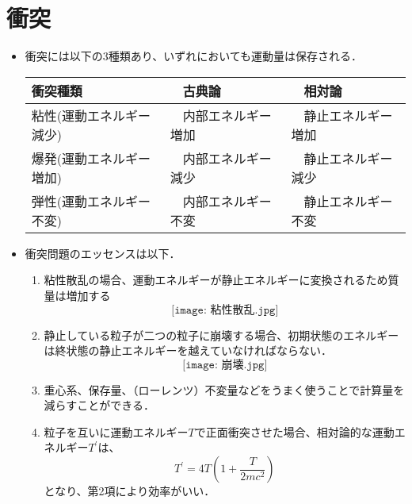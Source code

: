\documentclass[11pt,a4j]{jarticle}
\begin{document}
\section{衝突}
\begin{itemize}
	\item 衝突には以下の3種類あり、いずれにおいても運動量は保存される．
	\begin{table}[htb]
		\centering
		\begin{tabular}{|l|l|l|} \hline
			衝突種類　&　古典論	&　相対論	\\ \hline
			粘性(運動エネルギー減少)　&　内部エネルギー増加　&　静止エネルギー増加　\\ \hline
			爆発(運動エネルギー増加)　&　内部エネルギー減少　&　静止エネルギー減少　\\ \hline
			弾性(運動エネルギー不変)　&　内部エネルギー不変　&　静止エネルギー不変	\\ \hline
		\end{tabular}
	\end{table}
	\item 衝突問題のエッセンスは以下．
	\begin{enumerate}
		\item 粘性散乱の場合、運動エネルギーが静止エネルギーに変換されるため質量は増加する
		\[
			\texttt{[image: 粘性散乱.jpg]}
		\]
		\item 静止している粒子が二つの粒子に崩壊する場合、初期状態のエネルギーは終状態の静止エネルギーを越えていなければならない．
		\[
			\texttt{[image: 崩壊.jpg]}
		\]
		\item 重心系、保存量、（ローレンツ）不変量などをうまく使うことで計算量を減らすことができる．
		\item 粒子を互いに運動エネルギー$T$で正面衝突させた場合、相対論的な運動エネルギー$T^{\prime}$は、
		\[
			T^{\prime} = 4T \left( 1 + \frac{T}{2mc^2} \right)
		\]
		となり、第2項により効率がいい．
	\end{enumerate}
\end{itemize}
\end{document}
